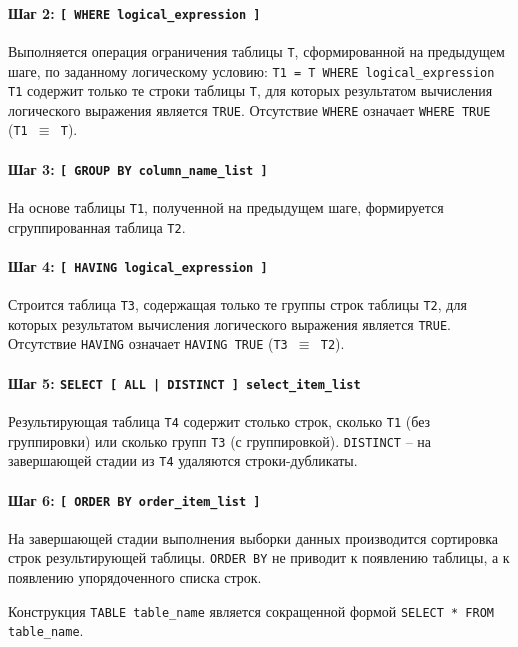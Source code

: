 \documentclass[a4paper,12pt]{article}
\begin{document}
\paragraph{Шаг 2: \texttt{[ WHERE logical\_expression ]}}  
Выполняется операция ограничения таблицы \texttt{T}, сформированной на предыдущем шаге, по заданному логическому условию: \texttt{T1 = T WHERE logical\_expression}  
\texttt{T1} содержит только те строки таблицы \texttt{T}, для которых результатом вычисления логического выражения является \texttt{TRUE}. Отсутствие \texttt{WHERE} означает \texttt{WHERE TRUE} (\texttt{T1 $\equiv$ T}).

\paragraph{Шаг 3: \texttt{[ GROUP BY column\_name\_list ]}}  
На основе таблицы \texttt{T1}, полученной на предыдущем шаге, формируется сгруппированная таблица \texttt{T2}.

\paragraph{Шаг 4: \texttt{[ HAVING logical\_expression ]}}  
Строится таблица \texttt{T3}, содержащая только те группы строк таблицы \texttt{T2}, для которых результатом вычисления логического выражения является \texttt{TRUE}.  
Отсутствие \texttt{HAVING} означает \texttt{HAVING TRUE} (\texttt{T3 $\equiv$ T2}).

\paragraph{Шаг 5: \texttt{SELECT [ ALL | DISTINCT ] select\_item\_list}}  
Результирующая таблица \texttt{T4} содержит столько строк, сколько \texttt{T1} (без группировки) или сколько групп \texttt{T3} (с группировкой).  
\texttt{DISTINCT} – на завершающей стадии из \texttt{T4} удаляются строки-дубликаты.

\paragraph{Шаг 6: \texttt{[ ORDER BY order\_item\_list ]}}  
На завершающей стадии выполнения выборки данных производится сортировка строк результирующей таблицы. \texttt{ORDER BY} не приводит к появлению таблицы, а к появлению упорядоченного списка строк.

Конструкция \texttt{TABLE table\_name} является сокращенной формой \texttt{SELECT * FROM table\_name}.
\end{document}
